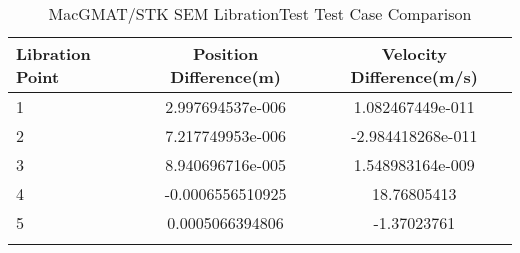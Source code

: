 \begin{table}[htbp!]
\centering
\caption{ MacGMAT/STK SEM LibrationTest Test Case Comparison}
      \begin{tabular}{lcc}
      \hline\hline
          Libration Point & Position Difference(m) & Velocity Difference(m/s) \\
         \hline
         1 & 2.997694537e-006 & 1.082467449e-011 \\
         2 & 7.217749953e-006 & -2.984418268e-011 \\
         3 & 8.940696716e-005 & 1.548983164e-009 \\
         4 & -0.0006556510925 & 18.76805413 \\
         5 & 0.0005066394806 & -1.37023761 \\
      \hline\hline
      \label{Table: SEM LibrationTest Table} 
\end{tabular}
\end{table}
